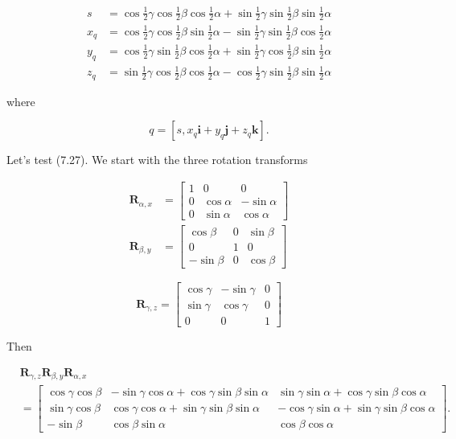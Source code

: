 $$
\begin{aligned}
s & =\cos \frac{1}{2} \gamma \cos \frac{1}{2} \beta \cos \frac{1}{2} \alpha+\sin \frac{1}{2} \gamma \sin \frac{1}{2} \beta \sin \frac{1}{2} \alpha \\
x_{q} & =\cos \frac{1}{2} \gamma \cos \frac{1}{2} \beta \sin \frac{1}{2} \alpha-\sin \frac{1}{2} \gamma \sin \frac{1}{2} \beta \cos \frac{1}{2} \alpha \\
y_{q} & =\cos \frac{1}{2} \gamma \sin \frac{1}{2} \beta \cos \frac{1}{2} \alpha+\sin \frac{1}{2} \gamma \cos \frac{1}{2} \beta \sin \frac{1}{2} \alpha \\
z_{q} & =\sin \frac{1}{2} \gamma \cos \frac{1}{2} \beta \cos \frac{1}{2} \alpha-\cos \frac{1}{2} \gamma \sin \frac{1}{2} \beta \sin \frac{1}{2} \alpha
\end{aligned}
$$

where

$$
q=\left[s, x_{q} \mathbf{i}+y_{q} \mathbf{j}+z_{q} \mathbf{k}\right] .
$$

Let's test (7.27). We start with the three rotation transforms

$$
\begin{aligned}
\mathbf{R}_{\alpha, x} & =\left[\begin{array}{ccc}
1 & 0 & 0 \\
0 & \cos \alpha & -\sin \alpha \\
0 & \sin \alpha & \cos \alpha
\end{array}\right] \\
\mathbf{R}_{\beta, y} & =\left[\begin{array}{ccc}
\cos \beta & 0 & \sin \beta \\
0 & 1 & 0 \\
-\sin \beta & 0 & \cos \beta
\end{array}\right]
\end{aligned}
$$

$$
\mathbf{R}_{\gamma, z}=\left[\begin{array}{ccc}
\cos \gamma & -\sin \gamma & 0 \\
\sin \gamma & \cos \gamma & 0 \\
0 & 0 & 1
\end{array}\right]
$$

Then

$$
\begin{aligned}
& \mathbf{R}_{\gamma, z} \mathbf{R}_{\beta, y} \mathbf{R}_{\alpha, x} \\
&= {\left[\begin{array}{ccc}
\cos \gamma \cos \beta & -\sin \gamma \cos \alpha+\cos \gamma \sin \beta \sin \alpha & \sin \gamma \sin \alpha+\cos \gamma \sin \beta \cos \alpha \\
\sin \gamma \cos \beta & \cos \gamma \cos \alpha+\sin \gamma \sin \beta \sin \alpha & -\cos \gamma \sin \alpha+\sin \gamma \sin \beta \cos \alpha \\
-\sin \beta & \cos \beta \sin \alpha & \cos \beta \cos \alpha
\end{array}\right] . }
\end{aligned}
$$

